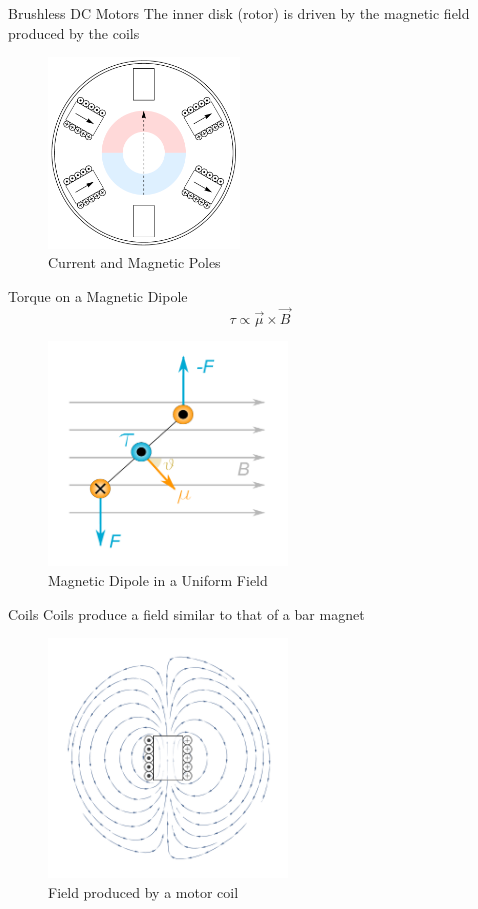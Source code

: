\documentclass{beamer}
\begin{document}
    \begin{frame}{Brushless DC Motors}
        The inner disk (rotor) is driven by the magnetic field produced by the coils
        \begin{figure}
            \center
            \includegraphics[width=2in]{motor_arrows.pdf}
            \caption*{Current and Magnetic Poles}
        \end{figure}
    \end{frame}

    \begin{frame}{Torque on a Magnetic Dipole}
        \[\tau \propto \vec{\mu} \times \vec{B}\]
        \begin{figure}
            \center
            \includegraphics[width=2.5in]{Momento_torcente_magnetico.pdf}
            \caption*{Magnetic Dipole in a Uniform Field}
        \end{figure}
    \end{frame}

    \begin{frame}{Coils}
        Coils produce a field similar to that of a bar magnet
        \begin{figure}
            \center
            \includegraphics[width=2.5in]{coil.pdf}
            \caption*{Field produced by a motor coil}
        \end{figure}
    \end{frame}
\end{document}
